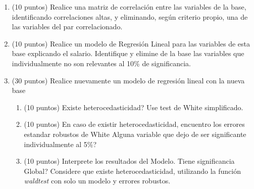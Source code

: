 \documentclass[letterpaper,11pt]{article}
\begin{document}
\begin{enumerate}

    \item (10 puntos) Realice una matriz de correlación entre las variables de la base, identificando correlaciones altas, y eliminando, según criterio propio, una de las variables del par correlacionado.


\item (10 puntos) Realice un modelo de Regresión Lineal para las variables de esta base explicando el salario. Identifique y elimine de la base las variables que individualmente no son relevantes al 10\% de significancia.  



   \item (30 puntos) Realice nuevamente un modelo de regresión lineal con la nueva base 
    \begin{enumerate}
        \item  (10 puntos) \textquestiondown Existe heterocedasticidad? Use test de White simplificado.

        \item (10 puntos) En caso de existir heterocedasticidad, encuentro los errores estandar robustos de White \textquestiondown Alguna variable que dejo de ser significante individualmente al 5\%?

        \item (10 puntos) Interprete los resultados del Modelo. \textquestiondown Tiene significancia Global? Considere que existe heterocedasticidad, utilizando la función \textit{waldtest} con solo un modelo y errores robustos. 
       
    \end{enumerate} 

\end{enumerate}
\end{document}
